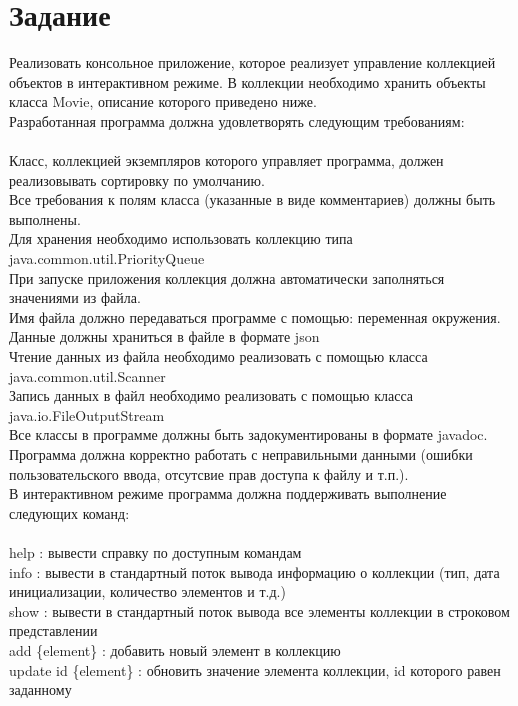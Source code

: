 

\section{Задание}
Реализовать консольное приложение, которое реализует управление коллекцией объектов в интерактивном режиме.
В коллекции необходимо хранить объекты класса Movie, описание которого приведено ниже.\\
Разработанная программа должна удовлетворять следующим требованиям:\\
\\
Класс, коллекцией экземпляров которого управляет программа, должен реализовывать сортировку по умолчанию.\\
Все требования к полям класса (указанные в виде комментариев) должны быть выполнены.\\
Для хранения необходимо использовать коллекцию типа java.common.util.PriorityQueue\\
При запуске приложения коллекция должна автоматически заполняться значениями из файла.\\
Имя файла должно передаваться программе с помощью: переменная окружения.\\
Данные должны храниться в файле в формате json\\
Чтение данных из файла необходимо реализовать с помощью класса java.common.util.Scanner\\
Запись данных в файл необходимо реализовать с помощью класса java.io.FileOutputStream\\
Все классы в программе должны быть задокументированы в формате javadoc.\\
Программа должна корректно работать с неправильными данными (ошибки пользовательского ввода, отсутсвие прав доступа к файлу и т.п.).\\
В интерактивном режиме программа должна поддерживать выполнение следующих команд:\\
\\
help : вывести справку по доступным командам\\
info : вывести в стандартный поток вывода информацию о коллекции (тип, дата инициализации, количество элементов и т.д.)\\
show : вывести в стандартный поток вывода все элементы коллекции в строковом представлении\\
add \{element\} : добавить новый элемент в коллекцию\\
update id \{element\} : обновить значение элемента коллекции, id которого равен заданному\\
